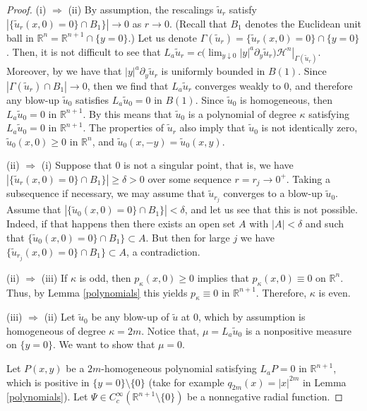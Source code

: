 \documentclass[11pt]{amsart}
\theoremstyle{plain}
\numberwithin{equation}{section}
\begin{document}
\begin{proof}
(i) $\Longrightarrow$ (ii)  By assumption, the rescalings $\tilde u_r$ satisfy $|\{\tilde u_r(x,0)=0\}\cap B_1\}|\to0$ as $r\to0$.
(Recall that $B_1$ denotes the Euclidean unit ball in ${\mathbb R}^n={\mathbb R}^{n+1}\cap\{y=0\}$.)
Let us denote $\Gamma(\tilde u_r)=\{\tilde u_r(x,0)=0\}\cap \{y=0\}$.
Then, it is not difficult to see that $L_a \tilde u_r=c\bigl(\lim_{y\downarrow0}|y|^a\partial_y \tilde u_r\bigr)\left.\mathcal H^n\right|_{\Gamma(\tilde u_r)}$.
Moreover, by \cite[Proposition 4.3]{CSS} we have that $|y|^a\partial_y \tilde u_r$ is uniformly bounded in $B(1)$.
Since $|\Gamma(\tilde u_r)\cap B_1|\to0$, then we find that $L_a \tilde u_r$ converges weakly to 0, and therefore any blow-up $\tilde u_0$ satisfies $L_a\tilde u_0=0$ in $B(1)$.
Since $\tilde u_0$ is homogeneous, then $L_a\tilde u_0=0$ in ${\mathbb R}^{n+1}$.
By \cite[Lemma 5.3]{CSS} this means that $\tilde u_0$ is a polynomial of degree $\kappa$ satisfying $L_a\tilde u_0=0$ in ${\mathbb R}^{n+1}$.
The properties of $\tilde u_r$ also imply that $\tilde u_0$ is not identically zero, $\tilde u_0(x,0)\geq0$ in ${\mathbb R}^n$, and $\tilde u_0(x,-y)=\tilde u_0(x,y)$.

(ii) $\Longrightarrow$ (i) Suppose that 0 is not a singular point, that is, we have $|\{\tilde u_r(x,0)=0\}\cap B_1\}|\geq\delta>0$ over some sequence $r=r_j\to0^+$.
Taking a subsequence if necessary, we may assume that $\tilde u_{r_j}$ converges to a blow-up $\tilde u_0$.
Assume that $|\{\tilde u_0(x,0)=0\}\cap B_1\}|<\delta$, and let us see that this is not possible.
Indeed, if that happens then there exists an open set $A$ with $|A|<\delta$ and such that $\{\tilde u_0(x,0)=0\}\cap B_1\}\subset A$.
But then for large $j$ we have $\{\tilde u_{r_j}(x,0)=0\}\cap B_1\}\subset A$, a contradiction.

(ii) $\Longrightarrow$ (iii) If $\kappa$ is odd, then $p_\kappa(x,0)\geq0$ implies that $p_\kappa(x,0)\equiv0$ on ${\mathbb R}^n$.
Thus, by Lemma \ref{polynomials} this yields $p_\kappa\equiv0$ in ${\mathbb R}^{n+1}$.
Therefore, $\kappa$ is even.

(iii) $\Longrightarrow$ (ii) Let $\tilde u_0$ be any blow-up of $\tilde u$ at $0$, which by assumption is homogeneous of degree $\kappa=2m$.
Notice that, $\mu=L_a \tilde u_0$ is a nonpositive measure on $\{y=0\}$.
We want to show that $\mu=0$.

Let $P(x,y)$ be a $2m$-homogeneous polynomial satisfying $L_aP=0$ in ${\mathbb R}^{n+1}$, which is positive in $\{y=0\}\setminus\{0\}$ (take for example $q_{2m}(x)=|x|^{2m}$ in Lemma \ref{polynomials}).
Let $\Psi\in C^\infty_c({\mathbb R}^{n+1}\setminus\{0\})$ be a nonnegative radial function.


\end{proof}
\end{document}
